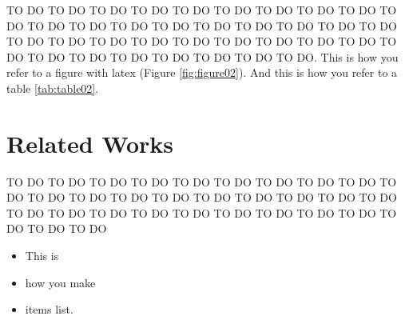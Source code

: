 TO DO TO DO TO DO TO DO TO DO TO DO TO DO TO DO TO DO TO DO TO DO TO DO TO DO TO DO TO DO TO DO TO DO TO DO TO DO TO DO TO DO TO DO TO DO TO DO TO DO TO DO TO DO TO DO TO DO TO DO TO DO TO DO TO DO TO DO TO DO TO DO. This is how you refer to a figure with latex (Figure \ref{fig:figure02}). And this is how you refer to a table \ref{tab:table02}.


\hypertarget{related-works}{%
\section{Related Works}\label{relatedworks}}

    TO DO TO DO TO DO TO DO TO DO TO DO TO DO TO DO TO DO TO DO TO DO TO DO TO DO TO DO TO DO TO DO TO DO TO DO TO DO TO DO TO DO TO DO TO DO TO DO TO DO TO DO TO DO TO DO TO DO TO DO TO DO

\begin{itemize}
    \item This is 
    \item how you make 
    \item items list.
\end{itemize}

